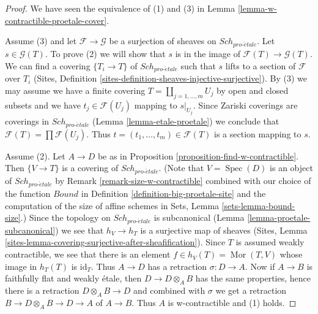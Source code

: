 \documentclass[10pt,a4paper]{amsart}
\theoremstyle{plain}
\theoremstyle{definition}
\theoremstyle{remark}
\numberwithin{equation}{subsection}
\def\Spec{\mathop{\mathrm{Spec}}}
\def\Sch{\mathit{Sch}}
\def\Mor{\mathop{\mathrm{Mor}}\nolimits}
\def\proetale{{pro\text{-}\acute{e}tale}}
\begin{document}
\begin{proof}
We have seen the equivalence of (1) and (3) in
Lemma \ref{lemma-w-contractible-proetale-cover}.

\medskip\noindent
Assume (3) and let $\mathcal{F} \to \mathcal{G}$ be a surjection of sheaves on
$\Sch_\proetale$. Let $s \in \mathcal{G}(T)$. To prove (2) we will show that
$s$ is in the image of $\mathcal{F}(T) \to \mathcal{G}(T)$. We can find a
covering $\{T_i \to T\}$ of $\Sch_\proetale$ such that $s$ lifts
to a section of $\mathcal{F}$ over $T_i$
(Sites, Definition \ref{sites-definition-sheaves-injective-surjective}).
By (3) we may assume we have a finite covering
$T = \coprod_{j = 1, \ldots, m} U_j$ by open and closed subsets
and we have $t_j \in \mathcal{F}(U_j)$ mapping to $s|_{U_j}$.
Since Zariski coverings are coverings in $\Sch_\proetale$
(Lemma \ref{lemma-etale-proetale}) we conclude that
$\mathcal{F}(T) = \prod \mathcal{F}(U_j)$.
Thus $t = (t_1, \ldots, t_m) \in \mathcal{F}(T)$
is a section mapping to $s$.

\medskip\noindent
Assume (2). Let $A \to D$ be as in
Proposition \ref{proposition-find-w-contractible}.
Then $\{V \to T\}$ is a covering of $\Sch_\proetale$.
(Note that $V = \Spec(D)$ is an object of $\Sch_\proetale$
by Remark \ref{remark-size-w-contractible}
combined with our choice of the function
$Bound$ in Definition \ref{definition-big-proetale-site}
and the computation of the size of affine schemes in
Sets, Lemma \ref{sets-lemma-bound-size}.)
Since the topology on $\Sch_\proetale$ is subcanonical
(Lemma \ref{lemma-proetale-subcanonical})
we see that $h_V \to h_T$ is a surjective map of sheaves
(Sites, Lemma \ref{sites-lemma-covering-surjective-after-sheafification}).
Since $T$ is assumed weakly contractible, we see that there is an element
$f \in h_V(T) = \Mor(T, V)$ whose image in $h_T(T)$ is $\text{id}_T$.
Thus $A \to D$ has a retraction $\sigma : D \to A$.
Now if $A \to B$ is faithfully flat and weakly \'etale, then
$D \to D \otimes_A B$ has the same properties, hence
there is a retraction $D \otimes_A B \to D$ and combined
with $\sigma$ we get a retraction $B \to D \otimes_A B \to D \to A$
of $A \to B$. Thus $A$ is w-contractible and (1) holds.
\end{proof}
\end{document}
